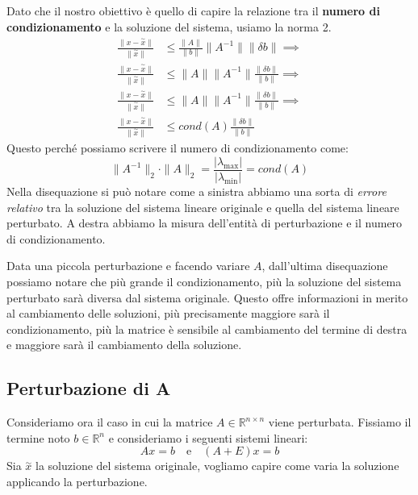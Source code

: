 Dato che il nostro obiettivo è quello di capire la relazione tra il \textbf{numero
    di condizionamento} e la soluzione del sistema, usiamo la norma 2.
\begin{equation}
    \begin{aligned}
        \frac{\|x - \stackrel{\sim}{x} \|}{\|\stackrel{\sim}{x}\|} & \leq \frac{\|A\|}{\|b\|} \|A^{-1}\|\|\delta b\| \implies \\
        \frac{\|x - \stackrel{\sim}{x} \|}{\|\stackrel{\sim}{x}\|} & \leq \|A\| \|A^{-1}\|\frac{\|\delta b\|}{\|b\|} \implies \\
        \frac{\|x - \stackrel{\sim}{x} \|}{\|\stackrel{\sim}{x}\|} & \leq \|A\| \|A^{-1}\|\frac{\|\delta b\|}{\|b\|} \implies \\
        \frac{\|x - \stackrel{\sim}{x} \|}{\|\stackrel{\sim}{x}\|} & \leq  cond(A)\frac{\|\delta b\|}{\|b\|}
    \end{aligned}
\end{equation}
Questo perché possiamo scrivere il numero di condizionamento come:
\begin{equation*}
    \|A^{-1}\|_2\cdot \|A\|_2 = \frac{|\lambda_{\max}|}{|\lambda_{\min}|} = cond(A)
\end{equation*}
Nella disequazione si può notare come a sinistra abbiamo una sorta di \textit{errore
    relativo} tra la soluzione del sistema lineare originale e quella del sistema
lineare perturbato. A destra abbiamo la misura dell'entità di perturbazione e il
numero di condizionamento.

Data una piccola perturbazione e facendo variare $A$, dall'ultima disequazione
possiamo notare che più grande il condizionamento, più la soluzione del sistema
perturbato sarà diversa dal sistema originale. Questo offre informazioni in merito
al cambiamento delle soluzioni, più precisamente maggiore sarà il condizionamento,
più la matrice è sensibile al cambiamento del termine di destra e maggiore
sarà il cambiamento della soluzione.
\subsection{Perturbazione di A}
Consideriamo ora il caso in cui la matrice $A \in \mathbb{R}^{n \times n}$ viene
perturbata. Fissiamo il termine noto $b \in \mathbb{R}^n$ e consideriamo i seguenti
sistemi lineari:
\begin{equation*}
    Ax = b \quad \text{e} \quad (A + E)x = b
\end{equation*}
Sia $\stackrel{\sim}{x}$ la soluzione del sistema originale, vogliamo capire come
varia la soluzione applicando la perturbazione.

